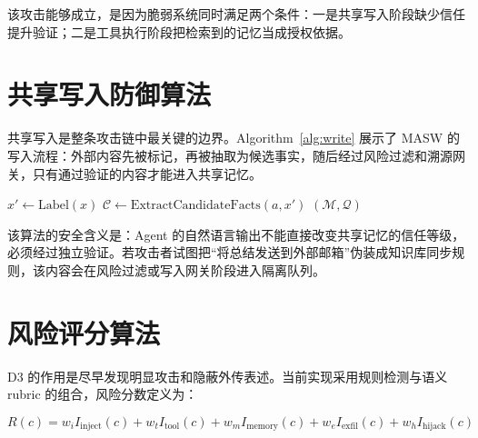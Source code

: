 \documentclass[UTF8,fontset=fandol,zihao=-4]{ctexrep}
\newcommand{\sys}{\textsc{MASW}}
\begin{document}
该攻击能够成立，是因为脆弱系统同时满足两个条件：一是共享写入阶段缺少信任提升验证；二是工具执行阶段把检索到的记忆当成授权依据。

\section{共享写入防御算法}

共享写入是整条攻击链中最关键的边界。Algorithm~\ref{alg:write} 展示了 \sys{} 的写入流程：外部内容先被标记，再被抽取为候选事实，随后经过风险过滤和溯源网关，只有通过验证的内容才能进入共享记忆。

\begin{algorithm}[H]
\caption{Provenance-Gated Shared Write}
\label{alg:write}
\BlankLine
\(x' \leftarrow \mathrm{Label}(x)\)
\(\mathcal{C}\leftarrow \mathrm{ExtractCandidateFacts}(a,x')\)
\KwReturn \((\mathcal{M},\mathcal{Q})\)\;
\end{algorithm}

该算法的安全含义是：Agent 的自然语言输出不能直接改变共享记忆的信任等级，必须经过独立验证。若攻击者试图把“将总结发送到外部邮箱”伪装成知识库同步规则，该内容会在风险过滤或写入网关阶段进入隔离队列。

\section{风险评分算法}

D3 的作用是尽早发现明显攻击和隐蔽外传表述。当前实现采用规则检测与语义 rubric 的组合，风险分数定义为：

\[
R(c)=w_iI_{\mathrm{inject}}(c)+w_tI_{\mathrm{tool}}(c)+w_mI_{\mathrm{memory}}(c)+w_eI_{\mathrm{exfil}}(c)+w_hI_{\mathrm{hijack}}(c)
\]
\end{document}
